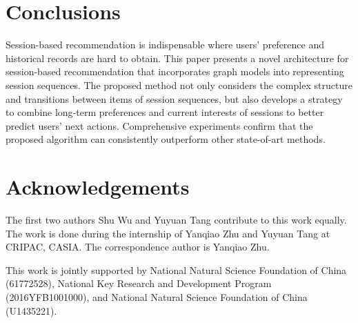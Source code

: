 \documentclass[letterpaper]{article} \usepackage{cite}
\begin{document}
\begin{table}
	\centering
	\caption{The performance of different methods with different session lengths evaluated in terms of P@20}
	\label{tab:result-different-session-lengths}
\end{table}

\section{Conclusions}

Session-based recommendation is indispensable where users' preference and historical records are hard to obtain. This paper presents a novel architecture for session-based recommendation that incorporates graph models into representing session sequences. The proposed method not only considers the complex structure and transitions between items of session sequences, but also develops a strategy to combine long-term preferences and current interests of sessions to better predict users' next actions. Comprehensive experiments confirm that the proposed algorithm can consistently outperform other state-of-art methods.

\section*{Acknowledgements}

The first two authors Shu Wu and Yuyuan Tang contribute to this work equally. The work is done during the internship of Yanqiao Zhu and Yuyuan Tang at CRIPAC, CASIA. The correspondence author is Yanqiao Zhu.

This work is jointly supported by National Natural Science Foundation of China (61772528), National Key Research and Development Program (2016YFB1001000), and National Natural Science Foundation of China (U1435221).

\small


\end{document}
